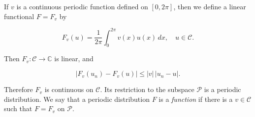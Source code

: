 If $v$ is a continuous periodic function defined on $[0, 2\pi]$, then we define a linear functional $F = F_v$ by

$$F_v(u) = \frac{1}{2\pi} \int_0^{2\pi} v(x)u(x) \, dx, \quad u \in \mathcal{C}.$$

Then $F_v: \mathcal{C} \to \mathbb{C}$ is linear, and

$$|F_v(u_n) - F_v(u)| \leq |v|\,|u_n - u|.$$

Therefore $F_v$ is continuous on $\mathcal{C}$. Its restriction to the subspace $\mathcal{P}$ is a periodic distribution. We say that a periodic distribution $F$ is a \textit{function} if there is a $v \in \mathcal{C}$ such that $F = F_v$ on $\mathcal{P}$.
